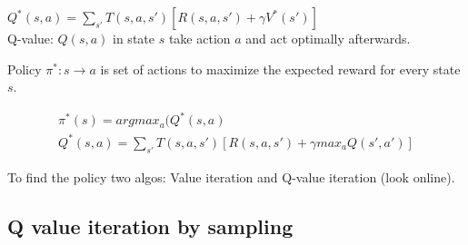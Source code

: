 $Q^{*}(s,a)=\sum _{s'}T(s,a,s')[R(s,a,s')+\gamma V^{*}(s')]$\\

Q-value: $Q(s,a)$ in state $s$ take action $a$ and act optimally afterwards. 

Policy $\pi^*: s \rightarrow a$ is set of actions to maximize the expected reward for every state $s$.

\begin{align*}
\pi^*(s) = argmax_a(Q^*(s,a)\\
Q^*(s,a)= \sum_{s'} T(s,a,s')[R(s,a,s') + \gamma max_a Q(s',a')]
\end{align*}

To find the policy two algos: Value iteration and Q-value iteration (look online).

\subsection{Q value iteration by sampling}






